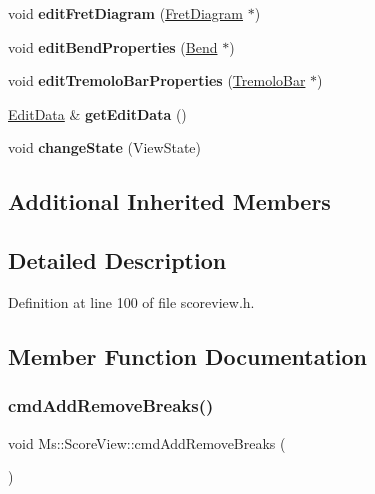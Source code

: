 \begin{DoxyCompactItemize}
void {\bfseries edit\+Fret\+Diagram} (\hyperlink{class_ms_1_1_fret_diagram}{Fret\+Diagram} $\ast$)
\item 
\mbox{\label{class_ms_1_1_score_view_acc1b9b748de634fb50e0217bb8207f2c}} 
void {\bfseries edit\+Bend\+Properties} (\hyperlink{class_ms_1_1_bend}{Bend} $\ast$)
\item 
\mbox{\label{class_ms_1_1_score_view_a3d6993d2dfdb3bcae6041a09b48e4daf}} 
void {\bfseries edit\+Tremolo\+Bar\+Properties} (\hyperlink{class_ms_1_1_tremolo_bar}{Tremolo\+Bar} $\ast$)
\item 
\mbox{\label{class_ms_1_1_score_view_aaba29d2fa853d1feb63e6ad55920d303}} 
\hyperlink{class_ms_1_1_edit_data}{Edit\+Data} \& {\bfseries get\+Edit\+Data} ()
\item 
\mbox{\label{class_ms_1_1_score_view_ae8b0b20a69a6cf9d2ba89e03158d4671}} 
void {\bfseries change\+State} (View\+State)
\end{DoxyCompactItemize}
\subsection*{Additional Inherited Members}


\subsection{Detailed Description}


Definition at line 100 of file scoreview.\+h.



\subsection{Member Function Documentation}
\mbox{\label{class_ms_1_1_score_view_a1dc0206a240c5b5e4b014fead61e8d6c}} 
\subsubsection{\texorpdfstring{cmd\+Add\+Remove\+Breaks()}{cmdAddRemoveBreaks()}}
{\footnotesize\ttfamily void Ms\+::\+Score\+View\+::cmd\+Add\+Remove\+Breaks (\begin{DoxyParamCaption}{ }\end{DoxyParamCaption})}

